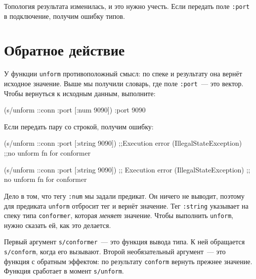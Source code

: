 Топология результата изменилась, и это нужно учесть. Если передать поле
\verb|:port| в подключение, получим ошибку типов.

\section{Обратное действие}


У функции \verb|unform| противоположный смысл: по спеке и результату она
вернёт исходное значение. Выше мы получили словарь, где поле \verb|:port|~--- это
вектор. Чтобы вернуться к исходным данным, выполните:

\begin{english}
  \begin{clojure}
(s/unform ::conn {:port [:num 9090]})
{:port 9090}
  \end{clojure}
\end{english}

\noindent
Если передать пару со строкой, получим ошибку:

\ifx\DEVICETYPE\MOBILE

\begin{english}
  \begin{clojure}
(s/unform ::conn {:port [:string 9090]})
;;Execution error (IllegalStateException)
;;no unform fn for conformer
  \end{clojure}
\end{english}

\else

\begin{english}
  \begin{clojure}
(s/unform ::conn {:port [:string 9090]})
;; Execution error (IllegalStateException)
;; no unform fn for conformer
  \end{clojure}
\end{english}

\fi

Дело в том, что тегу \verb|:num| мы задали предикат. Он ничего не выводит,
поэтому для предиката \verb|unform| отбросит тег и вернёт значение. Тег
\verb|:string| указывает на спеку типа \verb|conformer|, которая
\emph{меняет} значение. Чтобы выполнить \verb|unform|, нужно сказать ей, как
это делается.


Первый аргумент \verb|s/conformer|~--- это функция вывода типа. К ней обращается
\verb|s/conform|, когда его вызывают. Второй необязательный аргумент~--- это
функция с обратным эффектом: по результату \verb|conform| вернуть прежнее
значение. Функция сработает в момент \verb|s/unform|.

